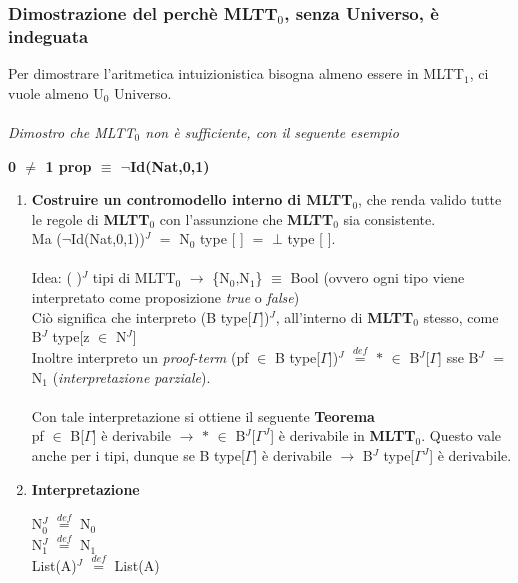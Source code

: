 \subsubsection{Dimostrazione del perch\`e MLTT$_0$, senza Universo, \`e indeguata}
\label{subsec:dimostro-perch\`e-MLTT$_0$-senza-Universo-\`e-indeguata}
Per dimostrare l'aritmetica intuizionistica bisogna almeno essere in MLTT$_1$, ci vuole almeno U$_0$ Universo.\\\\
\textit{Dimostro che MLTT$_0$ non \`e sufficiente, con il seguente esempio}
\begin{center}
\textbf{0 $\neq$ 1 prop $\equiv$ $\neg$Id(Nat,0,1)}
\end{center}
\noindent
\begin{enumerate}
\item \textbf{Costruire un contromodello interno di MLTT$_0$}, che renda valido tutte le regole di \textbf{MLTT$_0$} con l'assunzione che \textbf{MLTT$_0$} sia consistente.\\
Ma ($\neg$Id(Nat,0,1))$^J$ $=$ N$_0$ type [ ] $=$ $\bot$ type [ ].\\\\
\noindent
Idea: ( )$^J$ tipi di MLTT$_0$ $\rightarrow$ \{N$_0$,N$_1$\} $\equiv$ Bool (ovvero ogni tipo viene interpretato come proposizione \textit{true} o \textit{false})\\
Ci\`o significa che interpreto (B type[$\Gamma$])$^J$, all'interno di \textbf{MLTT$_0$} stesso, come B$^J$ type[z $\in$ N$^J$]\\
Inoltre interpreto un \textit{proof-term} (pf $\in$ B type[$\Gamma$])$^J$ ${\overset{\mathit{def}}{=}}$ $\ast$ $\in$ B$^J$[$\Gamma$] sse B$^J$ $=$ N$_1$ (\textit{interpretazione parziale}).\\\\
\noindent
Con tale interpretazione si ottiene il seguente \textbf{Teorema}\\
pf $\in$ B[$\Gamma$] \`e derivabile $\rightarrow$ $\ast$ $\in$ B$^J$[$\Gamma^J$] \`e derivabile in \textbf{MLTT$_0$}. Questo vale anche per i tipi, dunque se B type[$\Gamma$] \`e derivabile $\rightarrow$ B$^J$ type[$\Gamma^J$] \`e derivabile.
\item \textbf{Interpretazione}
\begin{center}
N$_0^J$ ${\overset{\mathit{def}}{=}}$ N$_0$\\
N$_1^J$ ${\overset{\mathit{def}}{=}}$ N$_1$\\
List(A)$^J$ ${\overset{\mathit{def}}{=}}$ List(A)\\

\end{center}
\end{enumerate}

